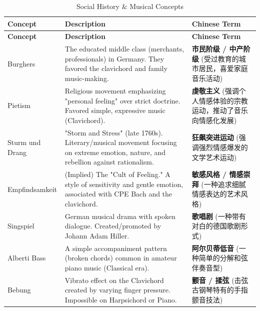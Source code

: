 \documentclass[math,code]{amznotes}
\theoremstyle{remark}
\begin{document}
\begin{longtable}{p{} p{} p{}}
\caption{Social History \& Musical Concepts} \\
\toprule
\textbf{Concept} & \textbf{Description} & \textbf{Chinese Term} \\
\midrule
\endfirsthead

\toprule
\textbf{Concept} & \textbf{Description} & \textbf{Chinese Term} \\
\midrule
\endhead

\bottomrule
\endfoot

Burghers & The educated middle class (merchants, professionals) in Germany. They favored the clavichord and family music-making. & \textbf{市民阶级 / 中产阶级} (受过教育的城市居民，喜爱家庭音乐活动) \\
\midrule
Pietism & Religious movement emphasizing "personal feeling" over strict doctrine. Favored simple, expressive music (Clavichord). & \textbf{虔敬主义} (强调个人情感体验的宗教运动，推动了音乐向情感化发展) \\
\midrule
Sturm und Drang & "Storm and Stress" (late 1760s). Literary/musical movement focusing on extreme emotion, nature, and rebellion against rationalism. & \textbf{狂飙突进运动} (强调强烈情感爆发的文学艺术运动) \\
\midrule
Empfindsamkeit & (Implied) The "Cult of Feeling." A style of sensitivity and gentle emotion, associated with CPE Bach and the clavichord. & \textbf{敏感风格 / 情感崇拜} (一种追求细腻情感表达的艺术风格) \\
\midrule
Singspiel & German musical drama with spoken dialogue. Created/promoted by Johann Adam Hiller. & \textbf{歌唱剧} (一种带有对白的德国歌剧形式) \\
\midrule
Alberti Bass & A simple accompaniment pattern (broken chords) common in amateur piano music (Classical era). & \textbf{阿尔贝蒂低音} (一种简单的分解和弦伴奏音型) \\
\midrule
Bebung & Vibrato effect on the Clavichord created by varying finger pressure. Impossible on Harpsichord or Piano. & \textbf{颤音 / 揉弦} (击弦古钢琴特有的手指颤音技法) \\
\end{longtable}
\end{document}

